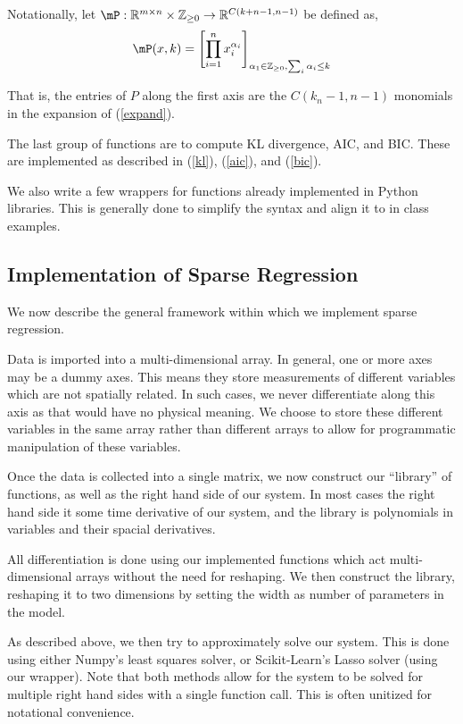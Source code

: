 \documentclass[10pt]{article}
\begin{document}
Notationally, let \( \mP: \RR^{m\times n}\times \ZZ_{\geq0} \to \RR^{C(k+n-1,n-1)} \) be defined as,
\begin{align}
    \mP(x,k) = \left[ \prod_{i=1}^{n}x_i^{\alpha_i} \right]_{\alpha_1 \in\ZZ_{\geq0}, \sum_i \alpha_i \leq k} \label{p}
\end{align}

That is, the entries of \( P \) along the first axis are the \( C(k_n-1,n-1) \) monomials in the expansion of (\ref{expand}).

The last group of functions are to compute KL divergence, AIC, and BIC. These are implemented as described in (\ref{kl}), (\ref{aic}), and (\ref{bic}).

We also write a few wrappers for functions already implemented in Python libraries. This is generally done to simplify the syntax and align it to in class examples.


\subsection{Implementation of Sparse Regression}
We now describe the general framework within which we implement sparse regression.

Data is imported into a multi-dimensional array. In general, one or more axes may be a dummy axes. This means they store measurements of different variables which are not spatially related. In such cases, we never differentiate along this axis as that would have no physical meaning. We choose to store these different variables in the same array rather than different arrays to allow for programmatic manipulation of these variables.

Once the data is collected into a single matrix, we now construct our ``library'' of functions, as well as the right hand side of our system. In most cases the right hand side it some time derivative of our system, and the library is polynomials in variables and their spacial derivatives.

All differentiation is done using our implemented functions which act multi-dimensional arrays without the need for reshaping. We then construct the library, reshaping it to two dimensions by setting the width as number of parameters in the model.

As described above, we then try to approximately solve our system.  This is done using either Numpy's least squares solver, or Scikit-Learn's Lasso solver (using our wrapper). Note that both methods allow for the system to be solved for multiple right hand sides with a single function call. This is often unitized for notational convenience.
\end{document}
